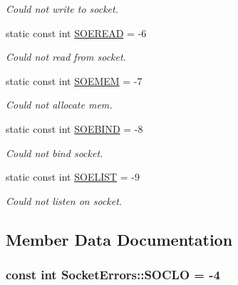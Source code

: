 \begin{DoxyCompactItemize}
\begin{DoxyCompactList}\small\item\em \-Could not write to socket. \end{DoxyCompactList}\item 
static const int \hyperlink{class_socket_errors_a019e0ba92390f1dbea86342d37c5e4b5}{\-S\-O\-E\-R\-E\-A\-D} = -\/6
\begin{DoxyCompactList}\small\item\em \-Could not read from socket. \end{DoxyCompactList}\item 
static const int \hyperlink{class_socket_errors_ad5d9bd316b2c6f6644cedb7ae245c087}{\-S\-O\-E\-M\-E\-M} = -\/7
\begin{DoxyCompactList}\small\item\em \-Could not allocate mem. \end{DoxyCompactList}\item 
static const int \hyperlink{class_socket_errors_a225189d5d61f1182aa597be3f5832a12}{\-S\-O\-E\-B\-I\-N\-D} = -\/8
\begin{DoxyCompactList}\small\item\em \-Could not bind socket. \end{DoxyCompactList}\item 
static const int \hyperlink{class_socket_errors_a9c55f054128988926f1518d4eb00cf06}{\-S\-O\-E\-L\-I\-S\-T} = -\/9
\begin{DoxyCompactList}\small\item\em \-Could not listen on socket. \end{DoxyCompactList}\end{DoxyCompactItemize}


\subsection{\-Member \-Data \-Documentation}
\hypertarget{class_socket_errors_a276fff8b55c0fff7083a6f8af86897b4}{
\subsubsection[{\-S\-O\-C\-L\-O}]{\setlength{\rightskip}{0pt plus 5cm}const int {\bf \-Socket\-Errors\-::\-S\-O\-C\-L\-O} = -\/4}}
\label{class_socket_errors_a276fff8b55c0fff7083a6f8af86897b4}


